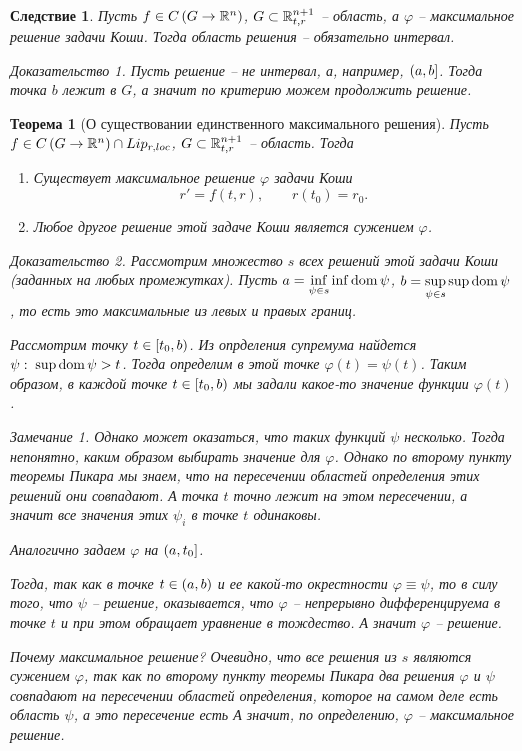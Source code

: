 \documentclass[a5paper, 10pt]{article}
\theoremstyle{definition}
\theoremstyle{plain}
\newtheorem{Th}{Теорема}
\newtheorem{Cor}{Следствие}
\theoremstyle{remark}
\newtheorem*{Note}{Замечание}
\newtheorem*{Proof}{Доказательство}
\begin{document}
	\begin{Cor}
		Пусть $f\in C\left(G\rightarrow \mathbb{R}^n\right)$, $G\subset \mathbb{R}_{t,r}^{n+1}$ -- область, а $\varphi$ -- максимальное решение задачи Коши. Тогда область решения -- обязательно интервал.
		\begin{Proof}
			Пусть решение -- не интервал, а, например, $\left(a,b\right]$. Тогда точка $b$ лежит в $G$, а значит по критерию можем продолжить решение.
		\end{Proof}
	\end{Cor}

	\begin{Th}[О существовании единственного максимального решения]
		Пусть $f\in C\left(G\rightarrow \mathbb{R}^n\right) \cap Lip_{r, loc}$, $G\subset \mathbb{R}_{t,r}^{n+1}$ -- область. 
		Тогда 
		\begin{enumerate}
			\item Существует максимальное решение $\varphi$ задачи Коши
			\[
			r'=f(t,r), \qquad r(t_0) = r_0.
			\]
			\item Любое другое решение этой задаче Коши является сужением $\varphi$.
		\end{enumerate}
	\begin{Proof}
		Рассмотрим множество $s$ всех решений этой задачи Коши (заданных на любых промежутках). 
		Пусть $a = \inf\limits_{\psi\in s}\inf \operatorname{dom} \psi$, $b = \sup\limits_{\psi\in s}\sup \operatorname{dom} \psi$, то есть это максимальные из левых и правых границ. 
		
		Рассмотрим точку $t\in \left[t_0,b\right)$. Из опрделения супремума найдется $\psi:\; \sup \operatorname{dom} \psi > t$. Тогда определим в этой точке $\varphi(t) = \psi(t)$. Таким образом, в каждой точке $t\in \left[t_0, b\right)$ мы задали какое-то значение функции $\varphi(t)$. 
		
		\begin{Note}
			Однако может оказаться, что таких функций $\psi$ несколько. Тогда непонятно, каким образом выбирать значение для $\varphi$. Однако по второму пункту теоремы Пикара мы знаем, что на пересечении областей определения этих решений они совпадают. А точка $t$ точно лежит на этом пересечении, а значит все значения этих $\psi_i$ в точке $t$ одинаковы.
		\end{Note}
	
		Аналогично задаем $\varphi$ на $\left(a,t_0\right]$. 
		
		Тогда, так как в точке $t \in \left(a,b\right)$ и ее какой-то окрестности $\varphi \equiv \psi$, то в силу того, что $\psi $ --  решение, оказывается, что $\varphi$ -- непрерывно дифференцируема в точке $t$ и при этом обращает уравнение в тождество. А значит $\varphi$ -- решение.
		
		Почему максимальное решение? Очевидно, что все решения из $s$ являются сужением $\varphi$, так как по второму пункту теоремы Пикара два решения $\varphi$ и $\psi$ совпадают на пересечении областей определения, которое на самом деле есть область $\psi$, а это пересечение есть А значит, по определению, $\varphi$ -- максимальное решение.
	\end{Proof}
	\end{Th}
\end{document}
